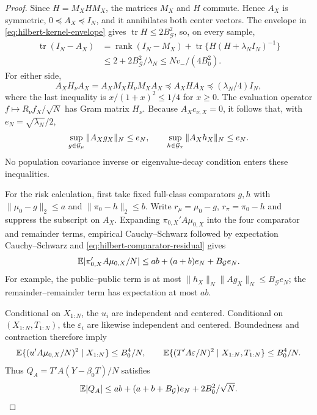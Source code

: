 \begin{proof}
Since $H=M_XHM_X$, the matrices $M_X$ and $H$ commute.  Hence
$A_X$ is symmetric, $0\preceq A_X\preceq I_N$, and it annihilates both
center vectors.  The envelope in \eqref{eq:hilbert-kernel-envelope} gives
$\operatorname{tr}H\le2B_{\mathcal G}^2$, so, on every sample,
\begin{equation}
 \begin{aligned}
 \operatorname{tr}(I_N-A_X)
 &=\operatorname{rank}(I_N-M_X)
   +\operatorname{tr}\{H(H+\lambda_N I_N)^{-1}\}\\
 &\le2+2B_{\mathcal G}^2/\lambda_N
 \le Nv_-/(4B_0^2).
 \end{aligned}
 \label{eq:hilbert-trace}
\end{equation}
For either side,
\begin{equation}
 A_XH_\nu A_X
 =A_XM_XH_\nu M_XA_X
 \preceq A_XHA_X\preceq(\lambda_N/4)I_N,
 \label{eq:hilbert-residual-matrix}
\end{equation}
where the last inequality is $x/(1+x)^2\le1/4$ for $x\ge0$.
The evaluation operator $f\mapsto R_\nu f_X/\sqrt N$ has Gram matrix
$H_\nu$.  Because $A_Xc_{\nu,X}=0$, it follows that, with
$e_N=\sqrt{\lambda_N}/2$,
\begin{equation}
 \sup_{g\in\mathcal G_\mu}\|A_Xg_X\|_N\le e_N,\qquad
 \sup_{h\in\mathcal G_\pi}\|A_Xh_X\|_N\le e_N.
 \label{eq:hilbert-comparator-residual}
\end{equation}
No population covariance inverse or eigenvalue-decay condition enters
these inequalities.

For the risk calculation, first take fixed full-class comparators $g,h$
with $\|\mu_0-g\|_2\le a$ and $\|\pi_0-h\|_2\le b$.
Write $r_\mu=\mu_0-g$, $r_\pi=\pi_0-h$ and suppress the subscript on
$A_X$.  Expanding $\pi_{0,X}'A\mu_{0,X}$ into the four comparator and
remainder terms, empirical Cauchy--Schwarz followed by expectation
Cauchy--Schwarz and \eqref{eq:hilbert-comparator-residual} gives
\begin{equation}
 \mathbb E|\pi_{0,X}'A\mu_{0,X}/N|
 \le ab+(a+b)e_N+B_{\mathcal G}e_N.
 \label{eq:hilbert-bias}
\end{equation}
For example, the public--public term is at most
$\|h_X\|_N\|Ag_X\|_N\le B_{\mathcal G}e_N$; the
remainder--remainder term has expectation at most $ab$.

Conditional on $X_{1:N}$, the $u_i$ are independent and centered.
Conditional on $(X_{1:N},T_{1:N})$, the $\varepsilon_i$ are likewise
independent and centered.  Boundedness and contraction therefore imply
\[
 \mathbb E\{(u'A\mu_{0,X}/N)^2\mid X_{1:N}\}\le B_0^4/N,
 \qquad
 \mathbb E\{(T'A\varepsilon/N)^2\mid X_{1:N},T_{1:N}\}\le B_0^4/N.
\]
Thus $Q_A=T'A(Y-\beta_0T)/N$ satisfies
\begin{equation}
 \mathbb E|Q_A|
 \le ab+(a+b+B_{\mathcal G})e_N+2B_0^2/\sqrt N.
 \label{eq:hilbert-numerator}
\end{equation}


\end{proof}
